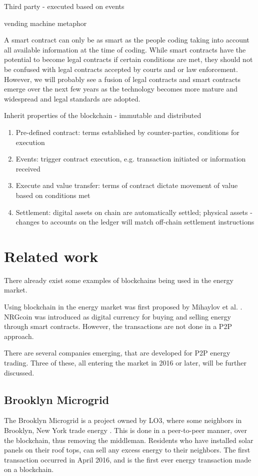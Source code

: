 Third party - executed based on events

vending machine metaphor 

A smart contract can only be as smart as the people coding taking into account all available information at the time of coding.
While smart contracts have the potential to become legal contracts if certain conditions are met, they should not be confused with legal contracts accepted by courts and or law enforcement. However, we will probably see a fusion of legal contracts and smart contracts emerge over the next few years as the technology becomes more mature and widespread and legal standards are adopted.

Inherit properties of the blockchain - immutable and distributed

\begin{enumerate}
\item Pre-defined contract: terms established by counter-parties, conditions for execution
\item Events: trigger contract execution, e.g. transaction initiated or information received
\item Execute and value transfer: terms of contract dictate movement of value based on conditions met
\item Settlement: digital assets on chain are automatically settled; physical assets - changes to accounts on the ledger will match off-chain settlement instructions
\end{enumerate}



\section{Related work}
There already exist some examples of blockchains being used in the energy market.  

Using blockchain in the energy market was first proposed by Mihaylov et al. \cite{NRGcoin_Mihaylov}. NRGcoin was introduced as digital currency for buying and selling energy through smart contracts. However, the transactions are not done in a P2P approach. 
 
There are several companies emerging, that are developed for P2P energy trading. Three of these, all entering the market in 2016 or later, will be further discussed. 


\subsection{Brooklyn Microgrid} \label{Brooklyn}
The Brooklyn Microgrid is a project owned by LO3, where some neighbors in Brooklyn, New York trade energy  \cite{bm101}. This is done in a peer-to-peer manner, over the blockchain, thus removing the middleman. Residents who have installed solar panels on their roof tops, can sell any excess energy to their neighbors. The first transaction occurred in April 2016, and is \cite{exergy, motherboard_bm} the first ever energy transaction made on a blockchain. 

